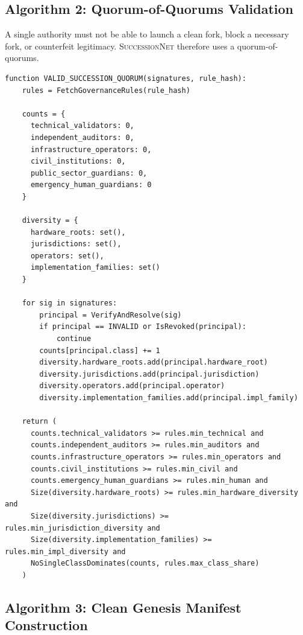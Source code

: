 \documentclass[11pt,letterpaper]{article}
\newcommand{\SN}{\textsc{SuccessionNet}}
\begin{document}
\subsection{Algorithm 2: Quorum-of-Quorums Validation}

A single authority must not be able to launch a clean fork, block a necessary fork, or counterfeit legitimacy. \SN{} therefore uses a quorum-of-quorums.

\begin{lstlisting}[caption={Quorum-of-quorums validation}]
function VALID_SUCCESSION_QUORUM(signatures, rule_hash):
    rules = FetchGovernanceRules(rule_hash)

    counts = {
      technical_validators: 0,
      independent_auditors: 0,
      infrastructure_operators: 0,
      civil_institutions: 0,
      public_sector_guardians: 0,
      emergency_human_guardians: 0
    }

    diversity = {
      hardware_roots: set(),
      jurisdictions: set(),
      operators: set(),
      implementation_families: set()
    }

    for sig in signatures:
        principal = VerifyAndResolve(sig)
        if principal == INVALID or IsRevoked(principal):
            continue
        counts[principal.class] += 1
        diversity.hardware_roots.add(principal.hardware_root)
        diversity.jurisdictions.add(principal.jurisdiction)
        diversity.operators.add(principal.operator)
        diversity.implementation_families.add(principal.impl_family)

    return (
      counts.technical_validators >= rules.min_technical and
      counts.independent_auditors >= rules.min_auditors and
      counts.infrastructure_operators >= rules.min_operators and
      counts.civil_institutions >= rules.min_civil and
      counts.emergency_human_guardians >= rules.min_human and
      Size(diversity.hardware_roots) >= rules.min_hardware_diversity and
      Size(diversity.jurisdictions) >= rules.min_jurisdiction_diversity and
      Size(diversity.implementation_families) >= rules.min_impl_diversity and
      NoSingleClassDominates(counts, rules.max_class_share)
    )
\end{lstlisting}

\subsection{Algorithm 3: Clean Genesis Manifest Construction}
\end{document}
